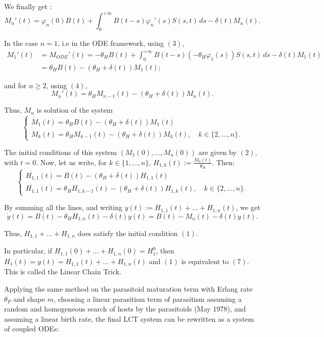 \documentclass[12pt,a4paper,onecolumn]{article}
\begin{document}
We finally get :
\[
M_n'(t) = \varphi_n(0) B(t) + \int_0^{+\infty} B(t-s)\varphi_n'(s) S(s,t) \, ds - \delta(t) M_n(t).
\]

In the case $n = 1$, i.e in the ODE framework, using $(3)$,
\begin{align*}
M_{1}'(t) &= M_{ODE}'(t)= -\theta_H B(t) + \int_0^{+\infty} B(t-s)(-\theta_H \varphi_1(s)) S(s,t) \, ds - \delta(t) M_1(t) \\
&= \theta_H B(t) - (\theta_H + \delta(t)) M_1(t) ;
\end{align*}

and for $n \geq 2$, using $(4)$,
\[
M_n'(t) = \theta_H M_{n-1}(t) - (\theta_H + \delta(t)) M_n(t).
\]

Thus, \(M_n\) is solution of the system 
\begin{equation}
\begin{cases}
\dot{M}_1(t) = \theta_H B(t) - (\theta_H + \delta(t)) M_1(t) \\
\dot{M}_k(t) = \theta_H M_{k-1}(t) - (\theta_H + \delta(t)) M_k(t), \quad k \in \{2, \dots, n\}.
\end{cases}
\end{equation}

The initial conditions of this system  $(M_1(0), \dots, M_n(0))$ are given by $(2)$, with $t = 0$.
Now, let us write, for \(k \in \{1, \dots, n\}\), $H_{1,k}(t) := \frac{M_k(t)}{\theta_H}$. Then:
\begin{equation}
\begin{cases}
\dot{H_{1,1}}(t) = B(t) - (\theta_H + \delta(t)) H_{1,1}(t) \\
\dot{H_{1,1}}(t) = \theta_H H_{1, k-1}(t) - (\theta_H + \delta(t)) H_{1,k}(t), \quad k \in \{2, \dots, n\}.
\end{cases}
\end{equation}

By summing all the lines, and writing $y(t) := H_{1,1}(t) + \dots + H_{1,n}(t)$, we get 
\[
\dot{y}(t) = B(t) - \theta_H H_{1,n}(t) - \delta(t) y(t) = B(t) - M_n(t) - \delta(t) y(t).
\]

Thus, $H_{1,1} + \dots + H_{1,n}$ does satisfy the initial condition $(1)$.

In particular, if $H_{1,1}(0) + \dots + H_{1,n}(0) =  H_1^0$, then $H_1(t) = y(t) = H_{1,1}(t) + \dots + H_{1,n}(t)$ and $(1)$ is equivalent to $(7)$. This is called the Linear Chain Trick.

Applying the same method on the parasitoid maturation term with Erlang rate $\theta_P$ and shape $m$, choosing a linear parasitism term of parasitism assuming a random and homogeneous search of hosts by the parasitoids (May 1978), and assuming a linear birth rate, the final LCT system can be rewritten as a system of coupled ODEs:
\end{document}
